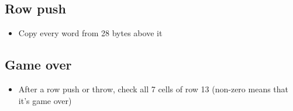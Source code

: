 \documentclass{article}
\begin{document}
\subsection{Row push}
\begin{itemize}
\item Copy every word from 28 bytes above it
\end{itemize}

\subsection{Game over}
\begin{itemize}
\item After a row push or throw, check all 7 cells of row 13 (non-zero means that it’s game over)
\end{itemize}
\end{document}
